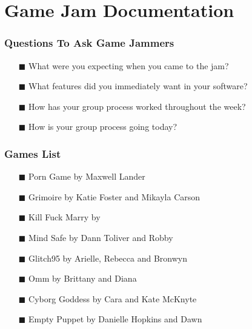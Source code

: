 
\chapter{Game Jam Documentation} %

\label{AppendixC} %



\subsection{Questions To Ask Game Jammers}


\begin{itemize} 
\item[\tiny{$\blacksquare$}] What were you expecting when you came to the jam?
\item[\tiny{$\blacksquare$}] What features did you immediately want in your software?
\item[\tiny{$\blacksquare$}] How has your group process worked throughout the week?
\item[\tiny{$\blacksquare$}] How is your group process going today?
\end{itemize}

\subsection{Games List}
\begin{itemize} 
\item[\tiny{$\blacksquare$}] Porn Game by Maxwell Lander
\item[\tiny{$\blacksquare$}] Grimoire by Katie Foster and Mikayla Carson
\item[\tiny{$\blacksquare$}] Kill Fuck Marry by 
\item[\tiny{$\blacksquare$}] Mind Safe by Dann Toliver and Robby
\item[\tiny{$\blacksquare$}] Glitch95 by Arielle, Rebecca and Bronwyn
\item[\tiny{$\blacksquare$}] Omm by Brittany and Diana
\item[\tiny{$\blacksquare$}] Cyborg Goddess by Cara and Kate McKnyte
\item[\tiny{$\blacksquare$}] Empty Puppet by Danielle Hopkins and Dawn
\end{itemize}

